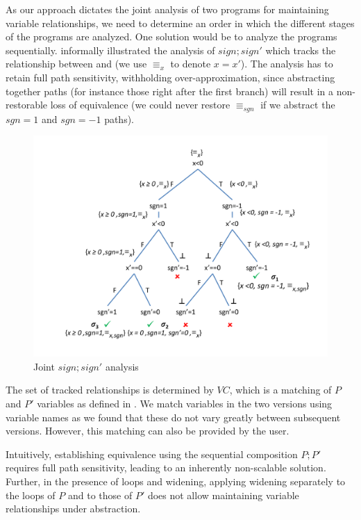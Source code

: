  As our approach dictates the joint analysis of two programs for maintaining variable relationships, we need to determine an order in which the different stages of the programs are analyzed. One solution would be to analyze the programs sequentially.  informally illustrated the analysis of $sign;sign'$ which tracks the relationship between  and  (we use $\equiv_{x}$ to denote $x=x'$). The analysis has to retain full path sensitivity, withholding over-approximation, since abstracting together paths (for instance those right after the first branch) will result in a non-restorable loss of equivalence (we could never restore $\equiv_{sgn}$ if we abstract the $sgn=1$ and $sgn=-1$ paths).
\begin{figure}
\centering
\includegraphics[scale=0.38,clip=true,trim = 75pt 25pt 5pt 20pt]{figures/sign-graph-joint}
\caption{Joint $sign;sign'$ analysis}
\end{figure}

The set of tracked relationships is determined by $VC$, which is a matching of $P$ and $P'$ variables as defined in . We match variables in the two versions using variable names as we found that these do not vary greatly between subsequent versions. However, this matching can also be provided by the user.

Intuitively, establishing equivalence using the sequential composition $P;P'$ requires full path sensitivity, leading to an inherently non-scalable solution. Further, in the presence of loops and widening, applying widening separately to the loops of $P$ and to those of $P'$ does not allow maintaining variable relationships under abstraction.

